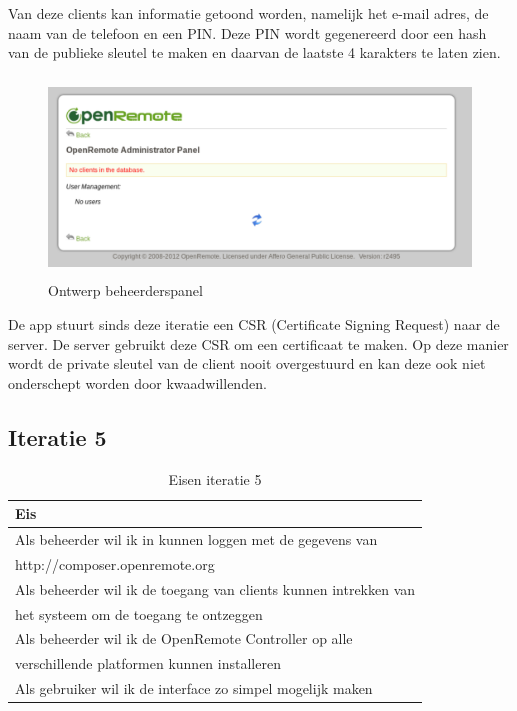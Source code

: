 \documentclass[]{article}
\begin{document}
Van deze clients kan informatie getoond worden, namelijk het e-mail adres,
de naam van de telefoon en een PIN. Deze PIN wordt gegenereerd door een
hash van de publieke sleutel te maken en daarvan de laatste 4 karakters te
laten zien.

\begin{figure}[h!]
  \centering
    \includegraphics[height=150pt,keepaspectratio]{adminv1.pdf}
  \caption{Ontwerp beheerderspanel}
  \label{adminv1}
\end{figure}

De app stuurt sinds deze iteratie een CSR (Certificate Signing Request) naar de server. De server
gebruikt deze CSR om een certificaat te maken. Op deze manier wordt de private
sleutel van de client nooit overgestuurd en kan deze ook niet onderschept
worden door kwaadwillenden.

\subsection{Iteratie 5}
\begin{table}[htpb]
  \caption{Eisen iteratie 5}
  \begin{center}
    \begin{tabular}{|| l ||}\hline
        Eis                                                              \\\hline\hline
        Als beheerder wil ik in kunnen loggen met de gegevens van        \\
        http://composer.openremote.org                                   \\\hline
        Als beheerder wil ik de toegang van clients kunnen intrekken van \\ 
        het systeem om de toegang te ontzeggen                           \\\hline
        Als beheerder wil ik de OpenRemote Controller op alle            \\ 
        verschillende platformen kunnen installeren                      \\\hline
        Als gebruiker wil ik de interface zo simpel mogelijk maken       \\\hline
    \end{tabular}
  \end{center}
\end{table}
\end{document}
